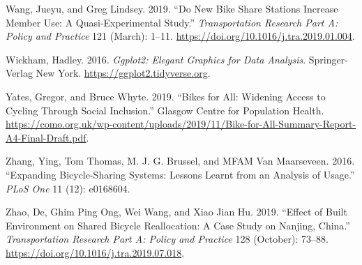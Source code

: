 \documentclass[
]{article}
\newlength{\cslhangindent}
\newenvironment{cslreferences}%
  {\setlength{\parindent}{0pt}%
  \everypar{\setlength{\hangindent}{\cslhangindent}}\ignorespaces}%
  {\par}
\begin{document}
\begin{cslreferences}
\leavevmode\hypertarget{ref-wang_new_2019}{}%
Wang, Jueyu, and Greg Lindsey. 2019. ``Do New Bike Share Stations Increase Member Use: A Quasi-Experimental Study.'' \emph{Transportation Research Part A: Policy and Practice} 121 (March): 1--11. \url{https://doi.org/10.1016/j.tra.2019.01.004}.

\leavevmode\hypertarget{ref-ggplot2}{}%
Wickham, Hadley. 2016. \emph{Ggplot2: Elegant Graphics for Data Analysis}. Springer-Verlag New York. \url{https://ggplot2.tidyverse.org}.

\leavevmode\hypertarget{ref-yates_bikes_2019}{}%
Yates, Gregor, and Bruce Whyte. 2019. ``Bikes for All: Widening Access to Cycling Through Social Inclusion.'' Glasgow Centre for Population Health. \url{https://como.org.uk/wp-content/uploads/2019/11/Bike-for-All-Summary-Report-A4-Final-Draft.pdf}.

\leavevmode\hypertarget{ref-zhang_expanding_2016}{}%
Zhang, Ying, Tom Thomas, M. J. G. Brussel, and MFAM Van Maarseveen. 2016. ``Expanding Bicycle-Sharing Systems: Lessons Learnt from an Analysis of Usage.'' \emph{PLoS One} 11 (12): e0168604.

\leavevmode\hypertarget{ref-zhao_effect_2019}{}%
Zhao, De, Ghim Ping Ong, Wei Wang, and Xiao Jian Hu. 2019. ``Effect of Built Environment on Shared Bicycle Reallocation: A Case Study on Nanjing, China.'' \emph{Transportation Research Part A: Policy and Practice} 128 (October): 73--88. \url{https://doi.org/10.1016/j.tra.2019.07.018}.
\end{cslreferences}
\end{document}
